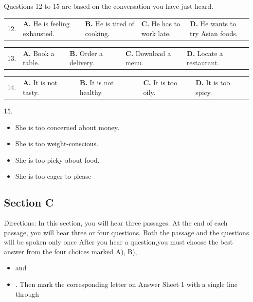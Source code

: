 \documentclass[UTF8,11pt]{ctexart}
\begin{document}
Questions 12 to 15 are based on the conversation you have just heard.


\noindent\begin{tabularx}{\linewidth}{@{}lXXXX@{}}12. & \textbf{A.} He is feeling exhausted. & \textbf{B.} He is tired of cooking. & \textbf{C.} He has to work late. & \textbf{D.} He wants to try Asian foods.\\\end{tabularx}\par

\noindent\begin{tabularx}{\linewidth}{@{}lXXXX@{}}13. & \textbf{A.} Book a table. & \textbf{B.} Order a delivery. & \textbf{C.} Download a menu. & \textbf{D.} Locate a restaurant.\\\end{tabularx}\par

\noindent\begin{tabularx}{\linewidth}{@{}lXXXX@{}}14. & \textbf{A.} It is not tasty. & \textbf{B.} It is not healthy. & \textbf{C.} It is too oily. & \textbf{D.} It is too spicy.\\\end{tabularx}\par

15.


\begin{itemize}[leftmargin=2em,itemsep=.2em,topsep=.4em]\item[A.] She is too concerned about money.
\item[B.] She is too weight-conscious.
\item[C.] She is too picky about food.
\item[D.] She is too eager to please
\end{itemize}

\subsection*{Section C}


Directions: In this section, you will hear three passages. At the end of each passage, you will hear three or four questions. Both the passage and the questions will be spoken only once After you hear a question,you must choose the best answer from the four choices marked A), B),


\begin{itemize}[leftmargin=2em,itemsep=.2em,topsep=.4em]\item[C.] and
\item[D.] . Then mark the corresponding letter on Answer Sheet 1 with a single line through
\end{itemize}
\end{document}

